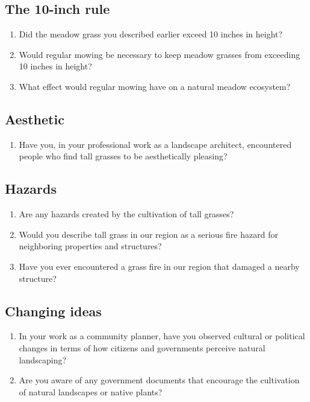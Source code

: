 \documentclass[12pt]{article}
\begin{document}
\subsection{The 10-inch rule}
\begin{enumerate}
\item Did the meadow grass you described earlier exceed 10 inches in height?
\item Would regular mowing be necessary to keep meadow grasses from exceeding 10 inches in height?
\item What effect would regular mowing have on a natural meadow ecosystem?
\end{enumerate}

\subsection{Aesthetic}
\begin{enumerate}
\item Have you, in your professional work as a landscape architect, encountered people who find tall grasses to be aesthetically pleasing?
\end{enumerate}


\subsection{Hazards}
\begin{enumerate}
\item Are any hazards created by the cultivation of tall grasses?
\item Would you describe tall grass in our region as a serious fire hazard for neighboring properties and structures?
\item Have you ever encountered a grass fire in our region that damaged a nearby structure?
\end{enumerate}


\subsection{Changing ideas}
\begin{enumerate}
\item In your work as a community planner, have you observed cultural or political changes in terms of how citizens and governments perceive natural landscaping?
\item Are you aware of any government documents that encourage the cultivation of natural landscapes or native plants?
\end{enumerate}
\end{document}
